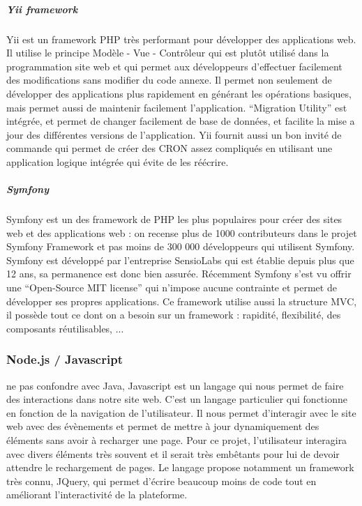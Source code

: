             \subparagraph{Yii framework}
            \label{subpar:yii}
            Yii est un framework PHP très performant pour développer des applications web. Il utilise le principe
            Modèle - Vue - Contrôleur qui est plutôt utilisé dans la programmation site web et qui permet aux développeurs
            d’effectuer facilement des modifications sans modifier du code annexe. Il permet non seulement de
            développer des applications plus rapidement en générant les opérations basiques, mais permet aussi de
            maintenir facilement l’application. “Migration Utility” est intégrée, et permet de changer facilement
            de base de données, et facilite la mise a jour des différentes versions de l’application. Yii fournit
            aussi un bon invité de commande qui permet de créer des CRON assez compliqués en utilisant une application
            logique intégrée qui évite de les réécrire.

            \subparagraph{Symfony}
            \label{subpar:symfony}
            Symfony est un des framework de PHP les plus populaires pour créer des sites web et des applications web :
            on recense plus de 1000 contributeurs dans le projet Symfony Framework et pas moins de 300 000 développeurs
            qui utilisent Symfony. Symfony est développé par l'entreprise SensioLabs qui est établie depuis plus que 12 ans,
            sa permanence est donc bien assurée. Récemment Symfony s’est vu offrir une “Open-Source MIT license”
            qui n'impose aucune contrainte et permet de développer ses propres applications. Ce framework utilise aussi
            la structure MVC, il possède tout ce dont on a besoin sur un framework : rapidité, flexibilité, des composants réutilisables, ...

        \subsubsection{Node.js / Javascript}
        \label{subsubsec:node}
         ne pas confondre avec Java, Javascript est un  langage qui nous permet de faire des interactions dans notre site web.
         C’est un langage particulier qui fonctionne en fonction de la navigation de l’utilisateur. Il nous permet d’interagir
         avec le site web avec des évènements et permet de mettre à jour dynamiquement des éléments sans avoir à recharger une page.
         Pour ce projet, l’utilisateur interagira avec divers éléments très souvent et il serait très embêtants pour lui
         de devoir attendre le rechargement de pages. Le langage propose notamment un framework très connu, JQuery,
         qui permet d’écrire beaucoup moins de code tout en améliorant l’interactivité de la plateforme.

